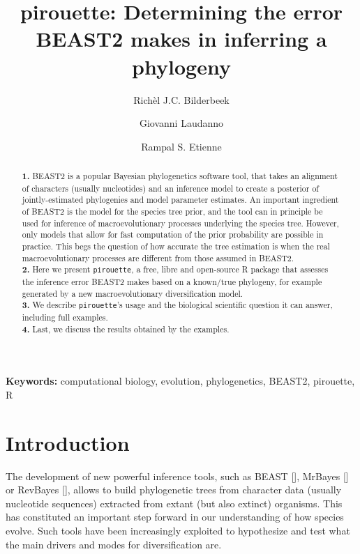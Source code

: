 \documentclass{article}
\title{pirouette: Determining the error BEAST2 makes in inferring a phylogeny}
\author[1]{Rich\`el J.C. Bilderbeek}
\author[1]{Giovanni Laudanno}
\author[1]{Rampal S. Etienne}
\affil[1]{Groningen Institute for Evolutionary Life Sciences, University of Groningen, Groningen, The Netherlands}
\begin{document}
\maketitle

\begin{abstract}

  \textbf{1. }
    BEAST2 is a popular Bayesian phylogenetics software tool,
    that takes an alignment of characters (usually nucleotides) 
    and an inference model to create a
    posterior of jointly-estimated phylogenies and model parameter 
    estimates. An important ingredient of BEAST2 is 
    the model for the species tree prior, 
    and the tool can in principle be used for inference of 
    macroevolutionary processes underlying the species tree. 
    However, only models that allow for fast computation of 
    the prior probability are possible in practice. 
    This begs the question of how accurate the tree estimation is 
    when the real macroevolutionary processes are different 
    from those assumed in BEAST2. \\
  \textbf{2. }
    Here we present \verb;pirouette;, 
    a free, libre and open-source R package that assesses 
    the inference error BEAST2 makes based on a known/true 
    phylogeny, for example generated by a new 
    macroevolutionary diversification model. \\
  \textbf{3. }
    We describe \verb;pirouette;'s usage and the biological scientific
    question it can answer, including full examples. \\
  \textbf{4. }
    Last, we discuss the results obtained by the examples. \\
\end{abstract}

{\bf Keywords:} computational biology, evolution, phylogenetics, BEAST2, pirouette, R

\section{Introduction}

The development of new powerful inference tools, 
such as BEAST [\cite{drummond2007beast}], 
MrBayes [\cite{huelsenbeck2001mrbayes}]
or RevBayes [\cite{hohna2016revbayes}], 
allows to build phylogenetic trees 
from character data (usually nucleotide sequences) extracted 
from extant (but also extinct) organisms.
This has constituted an important step forward 
in our understanding of how species evolve.
Such tools have been increasingly exploited to hypothesize 
and test what the main drivers and modes for diversification are.
\end{document}
